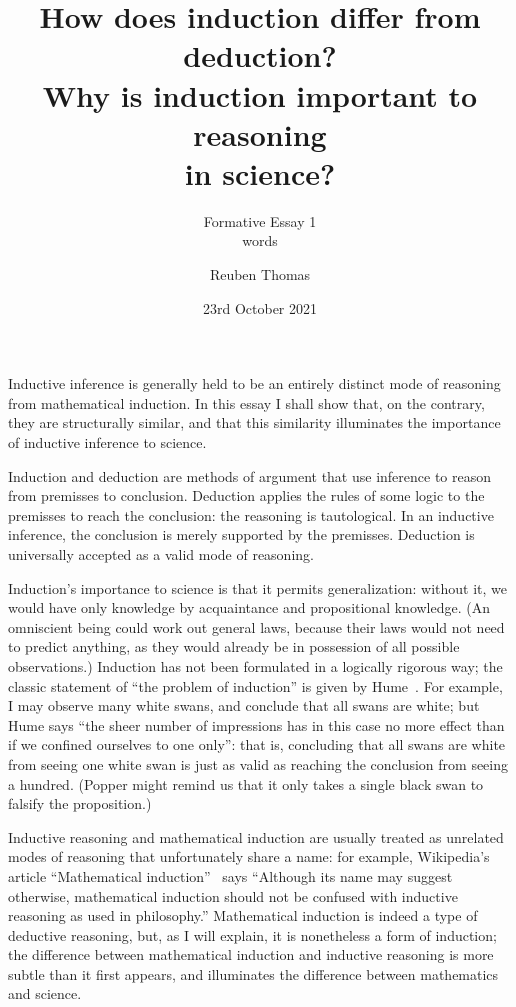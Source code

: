\documentclass[english]{scrartcl}
\begin{document}
\title{How does induction differ from deduction?\\Why is induction important to reasoning\\in science?}
\subtitle{Formative Essay 1\\words}
\author{Reuben Thomas}
\date{23rd October 2021}
\maketitle

Inductive inference is generally held to be an entirely distinct mode of reasoning from mathematical induction. In this essay I shall show that, on the contrary, they are structurally similar, and that this similarity illuminates the importance of inductive inference to science.

Induction and deduction are methods of argument that use inference to reason from premisses to conclusion. Deduction applies the rules of some logic to the premisses to reach the conclusion: the reasoning is tautological. In an inductive inference, the conclusion is merely supported by the premisses. Deduction is universally accepted as a valid mode of reasoning.

Induction’s importance to science is that it permits generalization: without it, we would have only knowledge by acquaintance and propositional knowledge. (An omniscient being could work out general laws, because their laws would not need to predict anything, as they would already be in possession of all possible observations.) Induction has not been formulated in a logically rigorous way; the classic statement of “the problem of induction” is given by Hume~\cite{hume1978}. For example, I may observe many white swans, and conclude that all swans are white; but Hume says “the sheer number of impressions has in this case no more effect than if we confined ourselves to one only”: that is, concluding that all swans are white from seeing one white swan is just as valid as reaching the conclusion from seeing a hundred. (Popper might remind us that it only takes a single black swan to falsify the proposition.)

Inductive reasoning and mathematical induction are usually treated as unrelated modes of reasoning that unfortunately share a name: for example, Wikipedia’s article “Mathematical induction”~\cite{wiki:mathematical-induction} says “Although its name may suggest otherwise, mathematical induction should not be confused with inductive reasoning as used in philosophy.” Mathematical induction is indeed a type of deductive reasoning, but, as I will explain, it is nonetheless a form of induction; the difference between mathematical induction and inductive reasoning is more subtle than it first appears, and illuminates the difference between mathematics and science.
\end{document}
